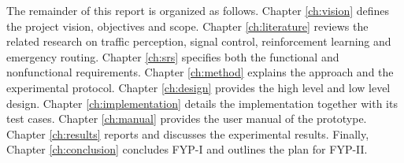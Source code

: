 The remainder of this report is organized as follows. Chapter \ref{ch:vision} defines the project vision, objectives and scope. Chapter \ref{ch:literature} reviews the related research on traffic perception, signal control, reinforcement learning and emergency routing. Chapter \ref{ch:srs} specifies both the functional and nonfunctional requirements. Chapter \ref{ch:method} explains the approach and the experimental protocol. Chapter \ref{ch:design} provides the high level and low level design. Chapter \ref{ch:implementation} details the implementation together with its test cases. Chapter \ref{ch:manual} provides the user manual of the prototype. Chapter \ref{ch:results} reports and discusses the experimental results. Finally, Chapter \ref{ch:conclusion} concludes FYP-I and outlines the plan for FYP-II.
